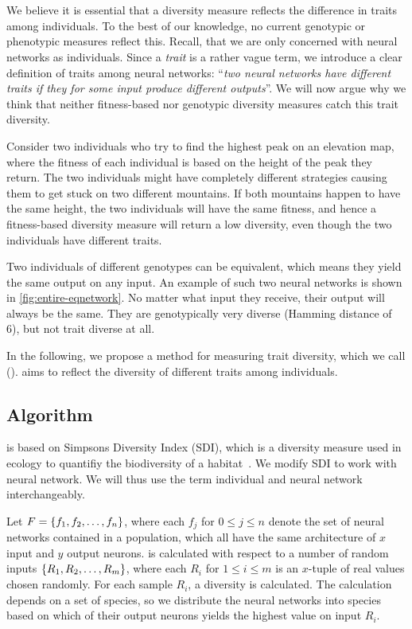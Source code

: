 \section{\di{}}
We believe it is essential that a diversity measure reflects the difference in traits among individuals. To the best of our knowledge, no current genotypic or phenotypic measures reflect this. Recall, that we are only concerned with neural networks as individuals. Since a \emph{trait} is a rather vague term, we introduce a clear definition of traits among neural networks: ``\emph{two neural networks have different traits if they for some input produce different outputs}''.
We will now argue why we think that neither fitness-based nor genotypic diversity measures catch this trait diversity. 

Consider two individuals who try to find the highest peak on an elevation map, where the fitness of each individual is based on the height of the peak they return.
The two individuals might have completely different strategies causing them to get stuck on two different mountains.
If both mountains happen to have the same height, the two individuals will have the same fitness, and hence a fitness-based diversity measure will return a low diversity, even though the two individuals have different traits.

Two individuals of different genotypes can be equivalent, which means they yield the same output on any input.
An example of such two neural networks is shown in \cref{fig:entire-eqnetwork}.
No matter what input they receive, their output will always be the same.
They are genotypically very diverse (Hamming distance of 6), but not trait diverse at all.
%

%

In the following, we propose a method for measuring trait diversity, which we call \emph{\di{}} (\dia). \dia{} aims to reflect the diversity of different traits among individuals. 

\subsection{Algorithm}
\dia{} is based on Simpsons Diversity Index (SDI), which is a diversity measure used in ecology to quantifiy the biodiversity of a habitat~\cite{simpson1949measurement}. We modify SDI to work with neural network. We will thus use the term individual and neural network interchangeably.

Let $F = \left\{ f_1, f_2, \dots, f_n \right\}$, where each $f_j$ for $0 \leq j \leq n$ denote the set of neural networks contained in a population, which all have the same architecture of $x$ input and $y$ output neurons. \dia{} is calculated with respect to a number of random inputs $\left\{ R_1, R_2, \dots, R_m \right\}$, where each $R_i$ for $1 \leq i \leq m$ is an $x$-tuple of real values chosen randomly. For each sample $R_i$, a diversity is calculated. The calculation depends on a set of species, so we distribute the neural networks into species based on which of their output neurons yields the highest value on input $R_i$. 

